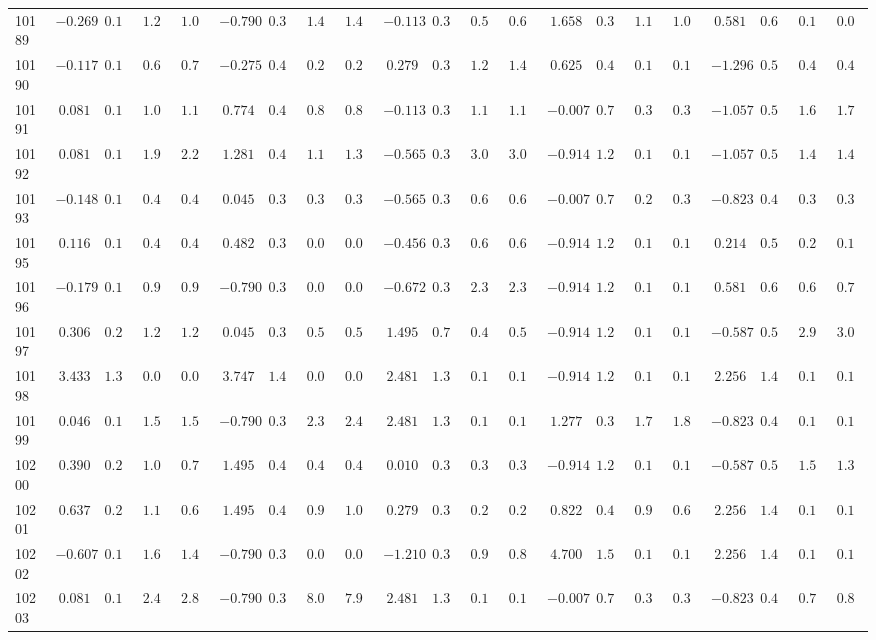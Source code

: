\begin{landscape}
{\begin{longtable}{l|rrrr|rrrr|rrrr|rrrr|rrrr}
10189&$-0.269$&$0.173$&$1.213$&$1.010$&$-0.790$&$0.389$&$1.412$&$1.439$&$-0.113$&$0.354$&$0.599$&$0.616$&$ 1.658$&$0.376$&$1.136$&$1.096$&$ 0.581$&$0.677$&$0.154$&$0.093$\tabularnewline
10190&$-0.117$&$0.178$&$0.697$&$0.774$&$-0.275$&$0.402$&$0.272$&$0.268$&$ 0.279$&$0.393$&$1.277$&$1.423$&$ 0.625$&$0.488$&$0.148$&$0.100$&$-1.296$&$0.509$&$0.472$&$0.498$\tabularnewline
10191&$ 0.081$&$0.188$&$1.074$&$1.161$&$ 0.774$&$0.401$&$0.821$&$0.878$&$-0.113$&$0.354$&$1.116$&$1.184$&$-0.007$&$0.714$&$0.316$&$0.348$&$-1.057$&$0.501$&$1.676$&$1.705$\tabularnewline
10192&$ 0.081$&$0.188$&$1.990$&$2.285$&$ 1.281$&$0.457$&$1.176$&$1.304$&$-0.565$&$0.334$&$3.047$&$3.084$&$-0.914$&$1.254$&$0.135$&$0.149$&$-1.057$&$0.501$&$1.495$&$1.458$\tabularnewline
10193&$-0.148$&$0.177$&$0.463$&$0.473$&$ 0.045$&$0.393$&$0.301$&$0.301$&$-0.565$&$0.334$&$0.648$&$0.671$&$-0.007$&$0.714$&$0.299$&$0.321$&$-0.823$&$0.499$&$0.356$&$0.360$\tabularnewline
10195&$ 0.116$&$0.190$&$0.477$&$0.417$&$ 0.482$&$0.389$&$0.097$&$0.098$&$-0.456$&$0.337$&$0.694$&$0.648$&$-0.914$&$1.254$&$0.135$&$0.149$&$ 0.214$&$0.594$&$0.256$&$0.188$\tabularnewline
10196&$-0.179$&$0.176$&$0.960$&$0.999$&$-0.790$&$0.389$&$0.054$&$0.055$&$-0.672$&$0.332$&$2.341$&$2.358$&$-0.914$&$1.254$&$0.135$&$0.149$&$ 0.581$&$0.677$&$0.678$&$0.730$\tabularnewline
10197&$ 0.306$&$0.204$&$1.249$&$1.259$&$ 0.045$&$0.393$&$0.562$&$0.568$&$ 1.495$&$0.741$&$0.470$&$0.516$&$-0.914$&$1.254$&$0.135$&$0.149$&$-0.587$&$0.505$&$2.915$&$3.082$\tabularnewline
10198&$ 3.433$&$1.352$&$0.030$&$0.034$&$ 3.747$&$1.435$&$0.083$&$0.086$&$ 2.481$&$1.316$&$0.105$&$0.119$&$-0.914$&$1.254$&$0.135$&$0.149$&$ 2.256$&$1.456$&$0.164$&$0.191$\tabularnewline
10199&$ 0.046$&$0.186$&$1.503$&$1.549$&$-0.790$&$0.389$&$2.383$&$2.418$&$ 2.481$&$1.316$&$0.105$&$0.119$&$ 1.277$&$0.383$&$1.793$&$1.898$&$-0.823$&$0.499$&$0.101$&$0.100$\tabularnewline
10200&$ 0.390$&$0.212$&$1.049$&$0.755$&$ 1.495$&$0.495$&$0.461$&$0.473$&$ 0.010$&$0.363$&$0.341$&$0.350$&$-0.914$&$1.254$&$0.135$&$0.149$&$-0.587$&$0.505$&$1.515$&$1.343$\tabularnewline
10201&$ 0.637$&$0.240$&$1.181$&$0.671$&$ 1.495$&$0.495$&$0.942$&$1.004$&$ 0.279$&$0.393$&$0.242$&$0.281$&$ 0.822$&$0.443$&$0.902$&$0.618$&$ 2.256$&$1.456$&$0.164$&$0.191$\tabularnewline
10202&$-0.607$&$0.166$&$1.613$&$1.457$&$-0.790$&$0.389$&$0.054$&$0.055$&$-1.210$&$0.340$&$0.914$&$0.856$&$ 4.700$&$1.542$&$0.119$&$0.147$&$ 2.256$&$1.456$&$0.164$&$0.191$\tabularnewline
10203&$ 0.081$&$0.188$&$2.427$&$2.880$&$-0.790$&$0.389$&$8.029$&$7.999$&$ 2.481$&$1.316$&$0.105$&$0.119$&$-0.007$&$0.714$&$0.316$&$0.348$&$-0.823$&$0.499$&$0.796$&$0.836$\tabularnewline

\end{longtable}}
\end{landscape}
